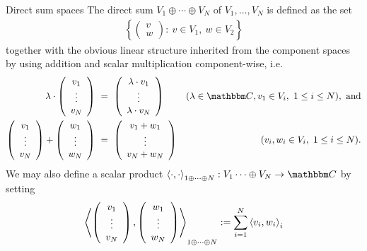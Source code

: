  \begin{subsection}{Direct sum spaces}
 The direct sum $V_1 \oplus \cdots \oplus V_N$ of $V_1, \dots, V_N$ is defined as the set
 \begin{align*}
   \left\{ \left(\begin{array}{c} v \\ w   \end{array}\right): \ v \in V_1,\ w \in V_2 \right\}
 \end{align*}
 together with the obvious linear structure inherited from the component spaces by using addition and scalar multiplication component-wise, i.e.
 \begin{align*}
  \lambda \cdot \left(\begin{array}{c} v_1 \\ \vdots \\ v_N   \end{array}\right) \ 
  & =  \ \left(\begin{array}{c} \lambda \cdot  v_1 \\ \vdots \\ \lambda \cdot v_N   \end{array}\right) &(\lambda \in \bbmC, v_1 \in V_i, \ 1 \leq i \leq N), \ \text{and} \\ 
  \left(\begin{array}{c} v_1 \\ \vdots \\ v_N   \end{array}\right) + \left(\begin{array}{c} w_1 \\ \vdots \\ w_N   \end{array}\right) \
  & = \ \left(\begin{array}{c} v_1 + w_1 \\ \vdots \\  v_N + w_N   \end{array}\right) &(v_i, w_i \in V_i, \ 1 \leq i \leq N).
 \end{align*}
 We may also define a scalar product $\braket{\cdot,\cdot}_{1 \oplus \dots \oplus N}: V_1 \cdots \oplus V_N \rightarrow \bbmC$ by setting
 \begin{align*}
  \left\langle \left(\begin{array}{c}v_1 \\ \vdots \\ v_N \end{array}\right), \left(\begin{array}{c}w_1 \\ \vdots \\ w_N \end{array} \right) \right\rangle_{1 \oplus \dots \oplus N} := \sum_{i=1}^N \braket{v_i,w_i}_i 

\end{align*}
\end{subsection}
